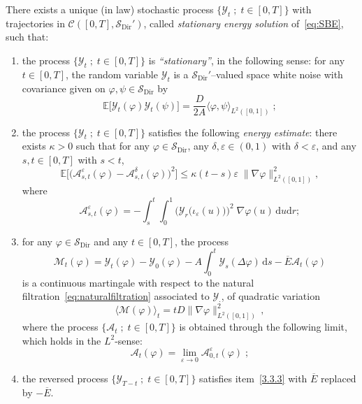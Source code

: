 \documentclass[AHL,Unicode,longabstracts]{cedram}
\DeclareMathOperator{\Dir}{Dir}
\newcommand{\bb}[1]{{\mathbb #1}}
\newcommand{\mc}[1]{{\mathcal #1}}
\renewcommand{\mc}[1]{{\mathcal #1}}
\newcommand{\SD}{\ensuremath{\mc S_{\Dir}}}
\renewcommand{\bar}{\overline}
\renewcommand{\leq}{\leqslant}
\newcommand*{\dd}{\mathrm{d}}
\newcommand*{\dr}{\dd r}
\newcommand*{\ds}{\dd s}
\newcommand*{\du}{\dd u}
\begin{document}
\begin{theo}\label{def:energy}
There exists a unique (in law) stochastic process $\{\mc Y_t \; ; \; t \in [0,T]\}$ with trajectories in $\mc C([0,T],\SD')$, called \emph{stationary energy solution} of~\eqref{eq:SBE}, such that:
\begin{enumerate}
\item \label{3.3.1} the process $\{\mc Y_t \; ; \; t \in [0,T]\}$ is \emph{``stationary''}, in the following sense: for any $t\in[0,T]$, the random variable $\mc Y_t$ is a $\SD'$--valued space white noise with covariance given on $\varphi,\psi \in \SD$ by
\[
\bb E \big[\mc Y_t(\varphi) \mc Y_t(\psi)\big] =\frac{D}{2A} \langle \varphi, \psi \rangle_{L^2([0,1])}\; ;
\]
\item \label{3.3.2} the process $\{\mc Y_t \; ; \; t \in [0,T]\}$ satisfies the following \emph{energy estimate}: there exists $\kappa >0$ such that for any $\varphi \in \mc S_{\Dir}$, any $\delta,\varepsilon \in (0,1)$ with $\delta < \varepsilon$, and any $s,t \in [0,T]$ with $s<t$,
\begin{equation}\label{eq:lipschitz}
\bb E\Big[\big(\mc A_{s,t}^\varepsilon (\varphi) - \mc A_{s,t}^\delta(\varphi)\big)^2\Big] \leq \kappa (t-s) \varepsilon \; \big\| \nabla \varphi\big\|^2_{L^2([0,1])},
\end{equation}
where
\begin{equation}
\mc A_{s,t}^\varepsilon(\varphi)= - \int_s^t \int_0^1 \Big(\mc Y_r\big(\iota_\varepsilon(u)\big)\Big)^2 \; \nabla \varphi(u)\,\du \dr; \label{eq:A}
\end{equation}
\item \label{3.3.3}
for any $\varphi \in \mc S_{\Dir}$ and any $t\in[0,T]$, the process
\[
\mc M_t (\varphi) = \mc Y_t(\varphi)-\mc Y_0(\varphi) - A \int_0^t \mc Y_s(\Delta \varphi)\,\ds - \bar E \mc A_t(\varphi)
\]
is a continuous martingale with respect to the natural filtration~\eqref{eq:naturalfiltration} associated to $\mc Y_\cdot$, of quadratic variation
\[
\big\langle \mc M (\varphi) \big\rangle_t = t D \big\|\nabla \varphi\big\|^2_{L^2([0,1])}\,,
\]
where the process $\{\mc A_t\; ; \; t\in[0,T]\}$ is obtained through the following limit, which holds in the $L^2$-sense:
\begin{equation}
\mc A_t(\varphi)= \lim_{\varepsilon \to 0} \mc A_{0,t}^\varepsilon(\varphi)\; ;\label{eq:B}
\end{equation}
\item \label{3.3.4} the reversed process $\{\mc Y_{T-t}\; ; \; t \in [0,T]\}$ satisfies item~\eqref{3.3.3} with $\bar E$ replaced by $-\bar E$.
\end{enumerate}
\end{theo}
\end{document}
